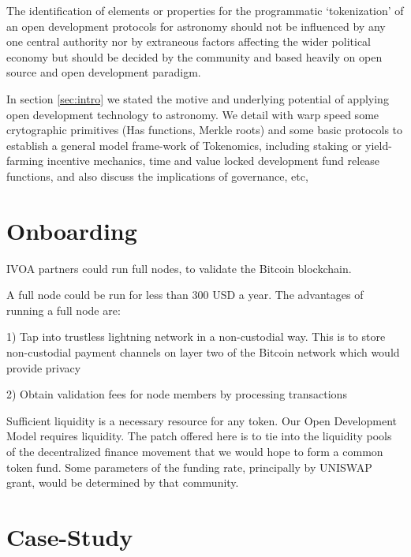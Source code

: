 \documentclass[final,5p,times,twocolumn,authoryear]{elsarticle}
\begin{document}
The identification of elements or properties for the programmatic `tokenization' of an open development protocols for astronomy should not be influenced by any one central authority nor by extraneous factors affecting the wider political economy but should be decided by the community and based heavily on open source and open development paradigm. 
   
In section \ref{sec:intro} we stated the motive and underlying potential of applying open development technology to astronomy. We detail with warp speed some crytographic primitives (Has functions, Merkle roots) and some basic protocols to establish a general model frame-work of Tokenomics, including staking or yield-farming incentive mechanics, time and value locked development fund release functions, and also discuss the implications of governance, etc,

\section{Onboarding}
\label{sec:use-case}

IVOA partners could run full nodes, to validate the Bitcoin blockchain.

A full node could be run for less than 300 USD a year. The advantages of running a full node are:

1) Tap into trustless lightning network in a non-custodial way. This is to store non-custodial payment channels on layer two of the Bitcoin network which would provide privacy 

2) Obtain validation fees for node members by processing transactions


Sufficient liquidity is a necessary resource for any token. Our Open Development Model requires liquidity. The patch offered here is to tie into the liquidity pools of the decentralized finance movement that we would hope to form a common token fund. Some parameters of the funding rate, principally by UNISWAP grant, would be determined by that community.   

\section{Case-Study}
\label{sec:btc5}
\end{document}

